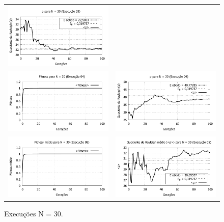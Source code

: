 \begin{figure}[p]
\begin{tabular}{@{}cc@{}}
    \includegraphics[width=.45\textwidth]{figs/resultados/fitnessGrad/N30_03_rho.pdf}   \\
		\includegraphics[width=.45\textwidth]{figs/resultados/fitnessGrad/N30_04_fitness.pdf} &
    \includegraphics[width=.45\textwidth]{figs/resultados/fitnessGrad/N30_04_rho.pdf}   \\
		\includegraphics[width=.45\textwidth]{figs/resultados/fitnessGrad/N30_05_fitness.pdf} &
    \includegraphics[width=.45\textwidth]{figs/resultados/fitnessGrad/N30_05_rho.pdf}
  \end{tabular}
  \caption{Execuções N = 30.}
	\label{fig:execucoes_N30}
\end{figure}

